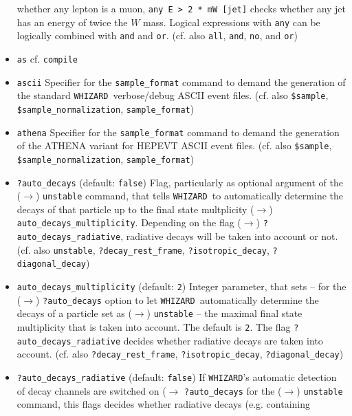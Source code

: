 \documentclass[12pt]{book}
\newcommand{\ttt}[1]{\texttt{#1}}
\newcommand{\whizard}{\texttt{WHIZARD}}
\begin{document}
\begin{itemize}
whether any lepton is a muon, \ttt{any E > 2 * mW [jet]} checks
whether any jet has an energy of twice the $W$ mass. Logical
expressions with \ttt{any} can be logically combined with \ttt{and}
and \ttt{or}. (cf. also \ttt{all}, \ttt{and}, \ttt{no}, and \ttt{or})
\item
\ttt{as} \newline
cf. \ttt{compile}
\item
\ttt{ascii} \newline 
Specifier for the \ttt{sample\_format} command to demand the
generation of the standard \whizard\ verbose/debug ASCII event
files. (cf. also \ttt{\$sample}, \ttt{\$sample\_normalization}, 
\ttt{sample\_format}) 
\item
\ttt{athena} \newline 
Specifier for the \ttt{sample\_format} command to demand the
generation of the ATHENA variant for HEPEVT ASCII event
files. (cf. also \ttt{\$sample}, \ttt{\$sample\_normalization}, 
\ttt{sample\_format}) 
\item
\ttt{?auto\_decays} \qquad (default: \ttt{false}) \newline
Flag, particularly as optional argument of the ($\to$) \ttt{unstable}
command, that tells \whizard\ to automatically determine the decays of
that particle up to the final state multplicity ($\to$)
\ttt{auto\_decays\_multiplicity}. Depending on the flag ($\to$)
\ttt{?auto\_decays\_radiative}, radiative decays will be taken into
account or not. (cf. also \ttt{unstable}, \ttt{?decay\_rest\_frame},
\ttt{?isotropic\_decay}, \ttt{?diagonal\_decay}) 
\item
\ttt{auto\_decays\_multiplicity} \qquad (default: \ttt{2}) \newline
Integer parameter, that sets -- for the ($\to$) \ttt{?auto\_decays}
option to let \whizard\ automatically determine the decays of a
particle set as ($\to$) \ttt{unstable} -- the maximal final state
multiplicity that is taken into account. The default is \ttt{2}. The
flag \ttt{?auto\_decays\_radiative} decides whether radiative decays
are taken into account. (cf. also \ttt{?decay\_rest\_frame},
\ttt{?isotropic\_decay}, \ttt{?diagonal\_decay}) 
\item
\ttt{?auto\_decays\_radiative} \qquad (default: \ttt{false}) \newline
If \whizard's automatic detection of decay channels are switched on
($\to$ \ttt{?auto\_decays} for the ($\to$) \ttt{unstable} command,
this flags decides whether radiative decays (e.g. containing

\end{itemize}
\end{document}

